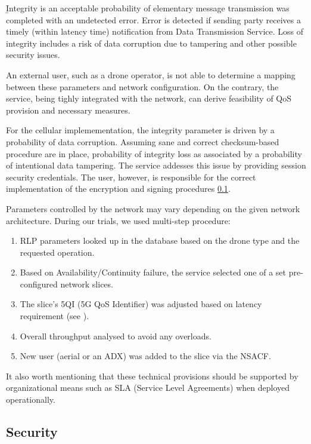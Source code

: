 \documentclass[a4paper,conference]{IEEEtran}
\begin{document}
{\b Integrity} is an acceptable probability of elementary message transmission was completed with an undetected error. Error is detected if sending party receives a timely (within latency time) notification from Data Transmission Service. Loss of integrity includes a risk of data corruption due to tampering and other possible security issues.

An external user, such as a drone operator, is not able to determine a mapping between these parameters and network configuration. On the contrary, the service, being tighly integrated with the network, can derive feasibility of QoS provision and necessary measures.

For the cellular implemementation, the integrity parameter is driven by a probability of data corruption. Assuming sane and correct checksum-based procedure are in place, probability of integrity loss as associated by a probability of intentional data tampering. The service addesses this issue by providing session security credentials. The user, however, is responsible for the correct implementation of the encryption and signing procedures \ref{security}.

Parameters controlled by the network may vary depending on the given network architecture. During our trials, we used multi-step procedure:

\begin{enumerate}
\item RLP parameters looked up in the database based on the drone type and the requested operation.
\item Based on Availability/Continuity failure, the service selected one of a set pre-configured network slices.
\item The slice's 5QI (5G QoS Identifier) was adjusted based on latency requirement (see \cite{3gpp:rely}).
\item Overall throughput analysed to avoid any overloads.
\item New user (aerial or an ADX) was added to the slice via the NSACF.
\end{enumerate}

It also worth mentioning that these technical provisions should be supported by organizational means such as SLA (Service Level Agreements) when deployed operationally.

\subsection{Security}
\label{security}
\end{document}

